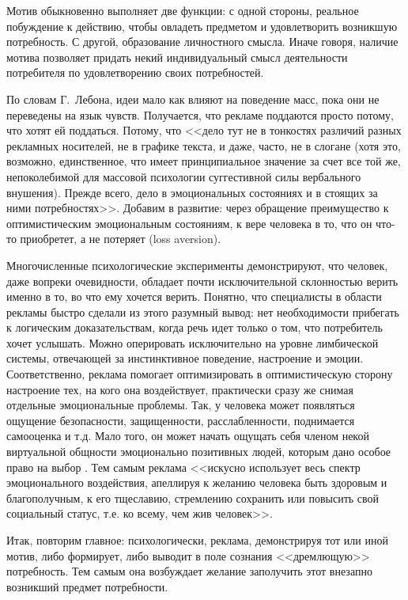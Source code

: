 Мотив обыкновенно выполняет две функции: с одной стороны, реальное побуждение
к действию, чтобы овладеть предметом и удовлетворить возникшую потребность.
С другой, образование личностного смысла. Иначе говоря, наличие мотива
позволяет придать некий индивидуальный смысл деятельности потребителя по
удовлетворению своих потребностей.

По словам Г.~Лебона, идеи мало как влияют на поведение масс, пока они не переведены
на язык чувств. Получается, что рекламе поддаются просто потому, что хотят
ей поддаться. Потому, что <<дело тут не в тонкостях различий разных рекламных
носителей, не в графике текста, и даже, часто, не в слогане (хотя это,
возможно, единственное, что имеет принципиальное значение за счет все той же,
непоколебимой для массовой психологии суггестивной силы вербального внушения).
Прежде всего, дело в эмоциональных состояниях и в стоящих за ними потребностях>>\autocite[][315]{olshansky}.
Добавим в развитие: через обращение преимущество к оптимистическим эмоциональным
состояниям, к вере человека в то, что он что-то приобретет, а не потеряет
(loss aversion).

Многочисленные психологические эксперименты демонстрируют, что человек,
даже вопреки очевидности, обладает почти исключительной склонностью верить
именно в то, во что ему хочется верить. Понятно, что специалисты в области
рекламы быстро сделали из этого разумный вывод: нет необходимости прибегать
к логическим доказательствам, когда речь идет только о том, что потребитель
хочет услышать. Можно оперировать исключительно на уровне лимбической системы,
отвечающей за инстинктивное поведение, настроение и эмоции. Соответственно,
реклама помогает оптимизировать в оптимистическую сторону настроение тех,
на кого она воздействует, практически сразу же снимая отдельные эмоциональные
проблемы. Так, у человека может появляться ощущение безопасности, защищенности,
расслабленности, поднимается самооценка и т.д. Мало того, он может начать
ощущать себя членом некой виртуальной общности эмоционально позитивных людей,
которым дано особое право на выбор
\autocites{ariely2009predictably}{dittrich2008upside}{martin2012}{lindstrom2010}.
Тем самым реклама <<искусно использует весь спектр эмоционального воздействия,
апеллируя к желанию человека быть здоровым и благополучным, к его тщеславию,
стремлению сохранить или повысить свой социальный статус, т.е. ко всему, чем
жив человек>>\autocite{feofanov1987}.

Итак, повторим главное: психологически, реклама, демонстрируя тот или иной мотив,
либо формирует, либо выводит в поле сознания <<дремлющую>> потребность.
Тем самым она возбуждает желание заполучить этот внезапно возникший предмет
потребности.

